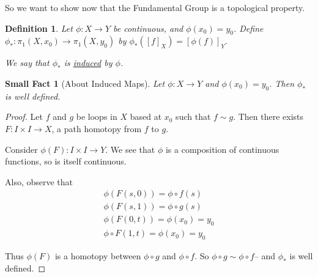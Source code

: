 \documentclass[11pt,letterpaper,boxed]{article}
\newtheorem*{defn}{Definition}
\newtheorem*{smallfact}{Small Fact}
\begin{document}
So we want to show now that the Fundamental Group is a topological property.

\begin{defn}  Let $\phi:X\to Y$ be continuous, and $\phi(x_0)=y_0$.  Define $\phi_*:
\pi_1(X,x_0)\to \pi_1(X,y_0)$ by $\phi_*([f]_X)=[\phi(f)]_Y.$

We say that $\phi_*$ is \underline{induced} by $\phi$.
\end{defn}

\vspace{.3in}
\begin{smallfact}[About Induced Maps]  Let $\phi:X\to Y$ and $\phi(x_0)=y_0$.  Then $\phi_*$ is well defined.
\end{smallfact}

\begin{proof}
Let $f$ and $g$ be loops in $X$ based at $x_0$ such that $f\sim g$.  Then there exists $F:I\times I\to X$, a path homotopy from $f$ to $g$.  \vspace{.4in}

Consider $\phi(F): I\times I \to Y$.  We see that $\phi$ is a composition of continuous functions, so is itself continuous.  
\vspace{.1in}

Also, observe that  \[\begin{array}{c} \phi(F(s,0))=\phi\circ f(s)\\ \phi(F(s,1))=\phi\circ g(s)\\ \hline \phi(F(0,t))=\phi(x_0)=y_0\\ \phi\circ F(1,t)=\phi(x_0)=y_0 \end{array}\]

Thus $\phi(F)$ is a homotopy between $\phi\circ g$ and $\phi\circ f$.  
So $\phi\circ g\sim \phi\circ f$-- and $\phi_*$ is well defined.

\end{proof}
\end{document}
